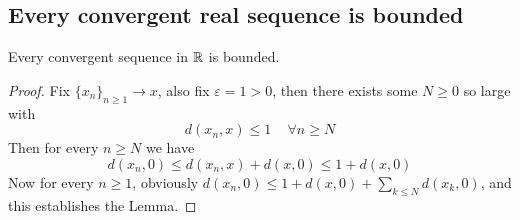 \documentclass[../../main.tex]{subfiles}
\begin{document}
\subsection{Every convergent real sequence is bounded}
\begin{lemma}\label{lemma:convergent implies boundedness}
    Every convergent sequence in $\mathbb{R}$ is bounded.
\end{lemma}
\begin{proof}
    Fix $\{x_n\}_{n\geq 1}\to x$, also fix $\varepsilon=1>0$, then there exists some $N\geq 0$ so large with
    \[
    d(x_n,x)\leq 1\,\quad\forall n\geq N
    \]
    Then for every $n\geq N$ we have
    \[
    d(x_n,0)\leq d(x_n, x) + d(x,0)\leq 1 + d(x,0)
    \]
    Now for every $n\geq 1$, obviously $d(x_n,0)\leq 1 + d(x,0) + \sum_{k\leq N}d(x_k,0)$, and this establishes the Lemma.
\end{proof}
\end{document}
